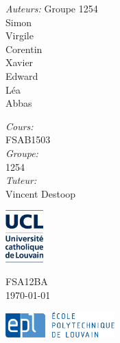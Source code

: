 \documentclass[a4paper]{report}
\begin{document}
\begin{titlepage}
\begin{center}
\begin{minipage}{0.4\textwidth}
\begin{flushleft} \large
\emph{Auteurs:}
Groupe 1254\\ Simon  \\ Virgile  \\ Corentin  \\ Xavier  \\Edward {}\\ Léa \\ Abbas 
\end{flushleft}
\end{minipage}
\begin{minipage}{0.4\textwidth}
\begin{flushright} \large
\emph{Cours:} \\
FSAB1503\\
\emph{Groupe:} \\
1254\\
\emph{Tuteur:} \\
Vincent Destoop \textsc{}
\end{flushright}
\end{minipage}
\vspace{0.4cm}

\begin{minipage}{0.3\textwidth}
\begin{flushleft}
\includegraphics[height=2cm]{Shema/logo_UCL_NEW_janv2013.JPG}
\end{flushleft}
\end{minipage}
\begin{minipage}{0.3\textwidth}
\begin{center}
{\large FSA12BA}\\
{\large \today}
\end{center}
\end{minipage}
\begin{minipage}{0.3\textwidth}
\begin{flushright}
\includegraphics[height=1cm]{Shema/epl-logo.jpg}
\end{flushright}
\end{minipage}
\end{center}
\end{titlepage}
\tableofcontents
\end{document}
